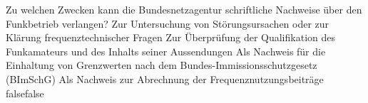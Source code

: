     {Zu welchen Zwecken kann die Bundesnetzagentur schriftliche Nachweise über den Funkbetrieb verlangen?}
    {Zur Untersuchung von Störungsursachen oder zur Klärung frequenztechnischer Fragen}
    {Zur Überprüfung der Qualifikation des Funkamateurs und des Inhalts seiner Aussendungen}
    {Als Nachweis für die Einhaltung von Grenzwerten nach dem Bundes-Immissionsschutzgesetz (BImSchG)}
    {Als Nachweis zur Abrechnung der Frequenznutzungsbeiträge}
    {false}{false}